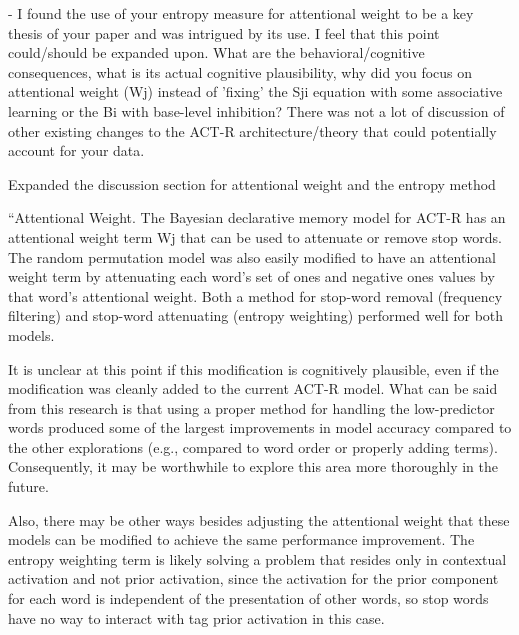 \documentclass[answers,12pt]{exam}
\begin{document}
\begin{questions}
\begin{solution}
\end{solution}

\question - I found the use of your entropy measure for attentional weight to be a key thesis of your paper and was intrigued by its use. I feel that this point could/should be expanded upon. What are the behavioral/cognitive consequences, what is its actual cognitive plausibility, why did you focus on attentional weight (Wj) instead of 'fixing' the Sji equation with some associative learning or the Bi with base-level inhibition? There was not a lot of discussion of other existing changes to the ACT-R architecture/theory that could potentially account for your data. 

\begin{solution}
Expanded the discussion section for attentional weight and the entropy method	

``Attentional Weight. The Bayesian declarative memory model for ACT-R has an attentional weight term Wj that can be used to attenuate or remove stop words. The random permutation model was also easily modified to have an attentional weight term by attenuating each word’s set of ones and negative ones values by that word’s attentional weight. Both a method for stop-word removal (frequency filtering) and stop-word attenuating (entropy weighting) performed well for both models.

It is unclear at this point if this modification is cognitively plausible, even if the modification was cleanly added to the current ACT-R model. What can be said from this research is that using a proper method for handling the low-predictor words produced some of the largest improvements in model accuracy compared to the other explorations (e.g., compared to word order or properly adding terms). Consequently, it may be worthwhile to explore this area more thoroughly in the future.

Also, there may be other ways besides adjusting the attentional weight that these models can be modified to achieve the same performance improvement. The entropy weighting term is likely solving a problem that resides only in contextual activation and not prior activation, since the activation for the prior component for each word is independent of the presentation of other words, so stop words have no way to interact with tag prior activation in this case.


\end{solution}
\end{questions}
\end{document}
